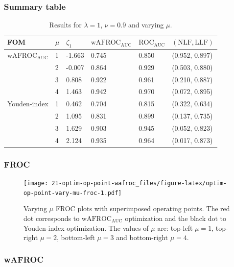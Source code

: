 \documentclass[
]{book}
\begin{document}
\hypertarget{summary-table-3}{%
\subsubsection{Summary table}\label{summary-table-3}}

\begin{table}

\caption{\label{tab:optim-op-point-table-vary-mu}Results for $\lambda = 1$, $\nu = 0.9$ and varying $\mu$.}
\centering
\fontsize{10}{12}\selectfont
\begin{tabular}[t]{llllll}
\toprule
FOM & $\mu$ & $\zeta_1$ & $\text{wAFROC}_\text{AUC}$ & $\text{ROC}_\text{AUC}$ & $\left( \text{NLF}, \text{LLF}\right)$\\
\midrule
$\text{wAFROC}_\text{AUC}$ & 1 & -1.663 & 0.745 & 0.850 & (0.952, 0.897)\\
 & 2 & -0.007 & 0.864 & 0.929 & (0.503, 0.880)\\
 & 3 & 0.808 & 0.922 & 0.961 & (0.210, 0.887)\\
 & 4 & 1.463 & 0.942 & 0.970 & (0.072, 0.895)\\
Youden-index & 1 & 0.462 & 0.704 & 0.815 & (0.322, 0.634)\\
\addlinespace
 & 2 & 1.095 & 0.831 & 0.899 & (0.137, 0.735)\\
 & 3 & 1.629 & 0.903 & 0.945 & (0.052, 0.823)\\
 & 4 & 2.124 & 0.935 & 0.964 & (0.017, 0.873)\\
\bottomrule
\end{tabular}
\end{table}

\hypertarget{froc-4}{%
\subsubsection{FROC}\label{froc-4}}

\begin{figure}
\centering
\texttt{[image: 21-optim-op-point-wafroc\_files/figure-latex/optim-op-point-vary-mu-froc-1.pdf]}
\caption{\label{fig:optim-op-point-vary-mu-froc}Varying \(\mu\) FROC plots with superimposed operating points. The red dot corresponds to \(\text{wAFROC}_\text{AUC}\) optimization and the black dot to Youden-index optimization. The values of \(\mu\) are: top-left \(\mu = 1\), top-right \(\mu = 2\), bottom-left \(\mu = 3\) and bottom-right \(\mu = 4\).}
\end{figure}

\hypertarget{wafroc-4}{%
\subsubsection{wAFROC}\label{wafroc-4}}
\end{document}
